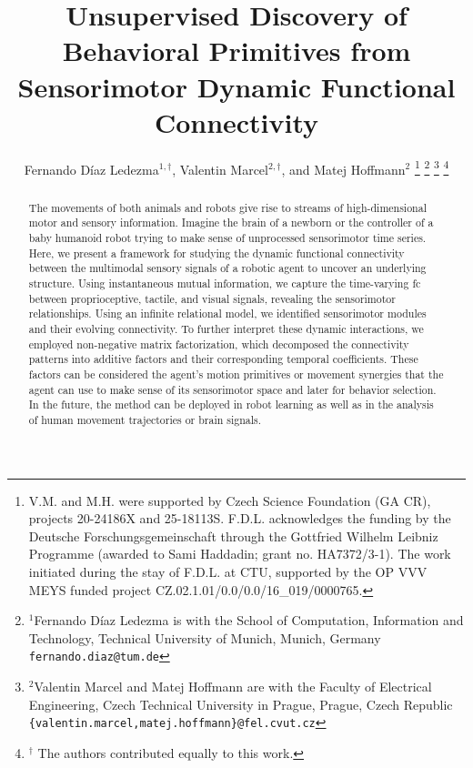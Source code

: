 \documentclass[letterpaper, 10 pt, conference]{ieeeconf}  %
\title{\LARGE \bf
Unsupervised Discovery of Behavioral Primitives from Sensorimotor Dynamic Functional Connectivity
}
\author{Fernando D\'iaz Ledezma$^{1,\dagger}$, Valentin Marcel$^{2,\dagger}$, and Matej Hoffmann$^{2}$%
\thanks{V.M. and M.H. were supported by Czech Science Foundation (GA CR), projects 20-24186X and 25-18113S.  F.D.L. acknowledges the funding by the Deutsche Forschungsgemeinschaft through the Gottfried Wilhelm Leibniz Programme (awarded to Sami Haddadin; grant no. HA7372/3-1). The work initiated during the stay of F.D.L. at CTU, supported by the OP VVV MEYS funded project CZ.02.1.01/0.0/0.0/16\_019/0000765.}%
\thanks{$^{1}$Fernando D\'iaz Ledezma is with the School of Computation, Information and Technology, Technical University of Munich, Munich, Germany {\tt\small fernando.diaz@tum.de}}%
\thanks{$^{2}$Valentin Marcel and Matej Hoffmann are with the Faculty of Electrical Engineering, Czech Technical University in Prague, Prague, Czech Republic
        {\tt\small \{valentin.marcel,matej.hoffmann\}@fel.cvut.cz}}%
\thanks{$^\dagger$ The authors contributed equally to this work.}
}
\begin{document}
\maketitle

\begin{abstract}
The movements of both animals and robots give rise to streams of high-dimensional motor and sensory information. Imagine the brain of a newborn or the controller of a baby humanoid robot trying to make sense of unprocessed sensorimotor time series. Here, we present a framework for studying the dynamic functional connectivity between the multimodal sensory signals of a robotic agent to uncover an underlying structure. Using instantaneous mutual information, we capture the time-varying \ac{fc} between proprioceptive, tactile, and visual signals, revealing the sensorimotor relationships. Using an infinite relational model, we identified sensorimotor modules and their evolving connectivity. To further interpret these dynamic interactions, we employed non-negative matrix factorization, which decomposed the connectivity patterns into additive factors and their corresponding temporal coefficients. These factors can be considered the agent’s motion primitives or movement synergies that the agent can use to make sense of its sensorimotor space and later for behavior selection. In the future, the method can be deployed in robot learning as well as in the analysis of human movement trajectories or brain signals.
\end{abstract}
\end{document}
